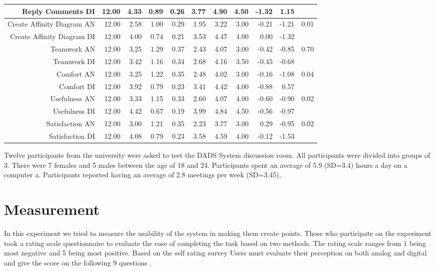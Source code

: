 \documentclass{sigchi}
\begin{document}
\begin{itemize}
\begin{itemize}
\begin{table}[ht]
\begin{tabular}{rrrrrrrrrrr}
  Reply Comments  DI & 12.00 & 4.33 & 0.89 & 0.26 & 3.77 & 4.90 & 4.50 & -1.32 & 1.15 &  \\ 
  \hline
  Create Affinity Diagram AN & 12.00 & 2.58 & 1.00 & 0.29 & 1.95 & 3.22 & 3.00 & -0.21 & -1.21 & 0.01 \\ 
  Create Affinity Diagram DI & 12.00 & 4.00 & 0.74 & 0.21 & 3.53 & 4.47 & 4.00 & 0.00 & -1.32 &  \\ 
 \hline
  Teamwork AN & 12.00 & 3.25 & 1.29 & 0.37 & 2.43 & 4.07 & 3.00 & -0.42 & -0.85 & 0.70 \\ 
  Teamwork DI & 12.00 & 3.42 & 1.16 & 0.34 & 2.68 & 4.16 & 3.50 & -0.45 & -0.68 &  \\ 
   \hline
  Comfort AN & 12.00 & 3.25 & 1.22 & 0.35 & 2.48 & 4.02 & 3.00 & -0.16 & -1.08 & 0.04 \\ 
  Comfort DI & 12.00 & 3.92 & 0.79 & 0.23 & 3.41 & 4.42 & 4.00 & -0.88 & 0.57 &  \\ 
   \hline
  Usefulness AN & 12.00 & 3.33 & 1.15 & 0.33 & 2.60 & 4.07 & 4.00 & -0.60 & -0.90 & 0.02 \\ 
  Usefulness DI & 12.00 & 4.42 & 0.67 & 0.19 & 3.99 & 4.84 & 4.50 & -0.56 & -0.97 &  \\ 
   \hline
  Satisfaction AN & 12.00 & 3.00 & 1.21 & 0.35 & 2.23 & 3.77 & 3.00 & 0.29 & -0.95 & 0.02 \\ 
  Satisfaction DI & 12.00 & 4.08 & 0.79 & 0.23 & 3.58 & 4.59 & 4.00 & -0.12 & -1.53 &  \\ 
   \hline
\end{tabular}
\end{table}


 Twelve  participants from the university  were asked to test the DADS System discussion room. All participants were divided into groups of 3. There were 7 females and 5 males between the age of 18 and 24.  Participants spent an average of 5.9 (SD=3.4) hours a day on a computer a. Participants reported having an average of 2.8 meetings per week (SD=3.45), 


\section{Measurement}
In this experiment we tried to measure the usability of the system in making them create points. 
Those who participate on the experiment  took a rating scale questionnaire to evaluate the ease of completing the task based on two methods. The rating scale ranges  from 1 being most negative and 5 being most positive.  Based on the self rating survey Users must evaluate their perception on both analog and digital and give the score on the following 9 questions . 


\end{itemize}
\end{itemize}
\end{document}
